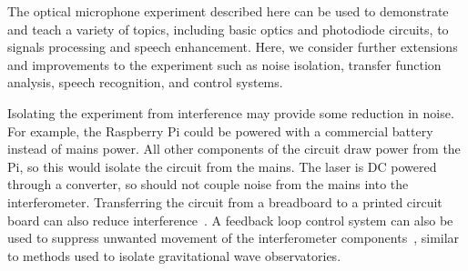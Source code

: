 \documentclass[paper-main.tex]{subfiles}
\begin{document}
The optical microphone experiment described here can be used to demonstrate and teach a variety of topics, including basic optics and photodiode circuits, to signals processing and speech enhancement. Here, we consider further extensions and improvements to the experiment such as noise isolation, transfer function analysis, speech recognition, and control systems.


Isolating the experiment from interference may provide some reduction in noise. 
For example, the Raspberry Pi could be powered with a commercial battery instead of mains power. 
All other components of the circuit draw power from the Pi, so this would isolate the circuit from the mains. 
The laser is DC powered through a converter, so should not couple noise from the mains into the interferometer. 
Transferring the circuit from a breadboard to a printed circuit board can also reduce interference~\cite{elfekey2013design}.
A feedback loop control system can also be used to suppress unwanted movement of the interferometer components~\citep{abbott2017exploring, Sekiguchi:2016bmv, verhoeven2009robust}, similar to methods used to isolate gravitational wave observatories. 
\end{document}
